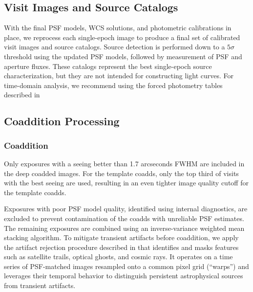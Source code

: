 \subsection{Visit Images and Source Catalogs}
\label{sssec:visit_images_source_catalogs}
With the final PSF models, WCS solutions, and photometric calibrations in place, we reprocess each single-epoch image to produce a final set of calibrated visit images and source catalogs.
Source detection is performed down to a $5\sigma$ threshold using the updated PSF models, followed by measurement of PSF and aperture fluxes.
These catalogs represent the best single-epoch source characterization, but they are not intended for constructing light curves.
For time-domain analysis, we recommend using the forced photometry tables described in 

\subsection{Coaddition Processing}
\label{ssec:coadd_processing}
\subsubsection{Coaddition}
\label{ssec:coaddition}
Only exposures with a seeing better than 1.7 arcseconds FWHM are included in the deep coadded images. For the template coadds, only the top third of visits with the best seeing are used, resulting in an even tighter image quality cutoff for the template coadds.

Exposures with poor PSF model quality, identified using internal diagnostics, are excluded to prevent contamination of the coadds with unreliable PSF estimates. 
The remaining exposures are combined using an inverse-variance weighted mean stacking algorithm.
To mitigate transient artifacts before coaddition, we apply the artifact rejection procedure described in \cite{dmtn-080} that identifies and masks features such as satellite trails, optical ghosts, and cosmic rays.
It operates on a time series of PSF-matched images resampled onto a common pixel grid (``warps'') and leverages their temporal behavior to distinguish persistent astrophysical sources from transient artifacts.

